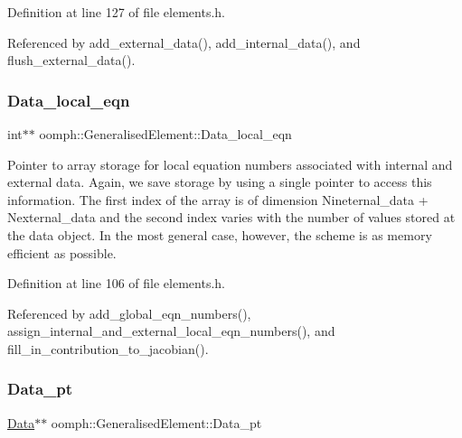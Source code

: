 Definition at line 127 of file elements.\+h.



Referenced by add\+\_\+external\+\_\+data(), add\+\_\+internal\+\_\+data(), and flush\+\_\+external\+\_\+data().

\mbox{\label{classoomph_1_1GeneralisedElement_a3b630de826d937b462845ade03c7df9f}} 
\subsubsection{\texorpdfstring{Data\+\_\+local\+\_\+eqn}{Data\_local\_eqn}}
{\footnotesize\ttfamily int$\ast$$\ast$ oomph\+::\+Generalised\+Element\+::\+Data\+\_\+local\+\_\+eqn\hspace{0.3cm}{\ttfamily [private]}}



Pointer to array storage for local equation numbers associated with internal and external data. Again, we save storage by using a single pointer to access this information. The first index of the array is of dimension Nineternal\+\_\+data + Nexternal\+\_\+data and the second index varies with the number of values stored at the data object. In the most general case, however, the scheme is as memory efficient as possible. 



Definition at line 106 of file elements.\+h.



Referenced by add\+\_\+global\+\_\+eqn\+\_\+numbers(), assign\+\_\+internal\+\_\+and\+\_\+external\+\_\+local\+\_\+eqn\+\_\+numbers(), and fill\+\_\+in\+\_\+contribution\+\_\+to\+\_\+jacobian().

\mbox{\label{classoomph_1_1GeneralisedElement_acbc80dc7b2800b561b7a016a03031cd3}} 
\subsubsection{\texorpdfstring{Data\+\_\+pt}{Data\_pt}}
{\footnotesize\ttfamily \hyperlink{classoomph_1_1Data}{Data}$\ast$$\ast$ oomph\+::\+Generalised\+Element\+::\+Data\+\_\+pt\hspace{0.3cm}{\ttfamily [private]}}



